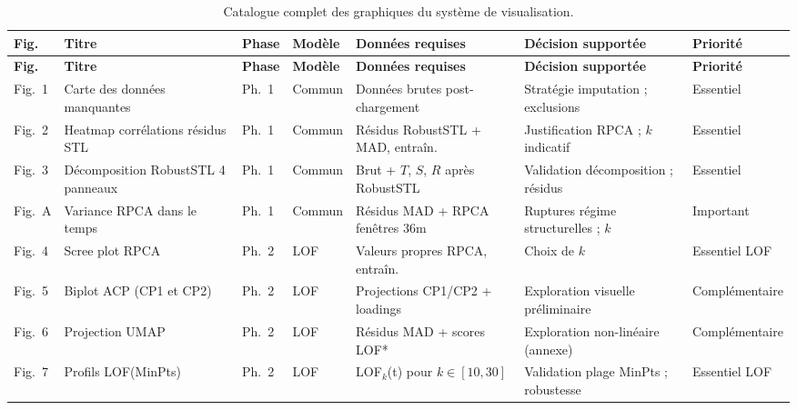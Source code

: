 \documentclass[12pt,a4paper]{article}
\begin{document}
\begin{landscape}
\begin{longtable}{p{1.5cm}p{3.8cm}p{2cm}p{1.5cm}p{3cm}p{3.5cm}p{2cm}}
\caption{Catalogue complet des graphiques du système de visualisation.}
\label{tab:catalogue}\\
\toprule
\textbf{Fig.} & \textbf{Titre} & \textbf{Phase} &
\textbf{Modèle} & \textbf{Données requises} &
\textbf{Décision supportée} & \textbf{Priorité} \\
\midrule
\endfirsthead
\toprule
\textbf{Fig.} & \textbf{Titre} & \textbf{Phase} &
\textbf{Modèle} & \textbf{Données requises} &
\textbf{Décision supportée} & \textbf{Priorité} \\
\midrule
\endhead
\bottomrule\endlastfoot

Fig.~1 & Carte des données manquantes &
Ph.~1 & Commun &
Données brutes post-chargement &
Stratégie imputation ; exclusions &
Essentiel \\
\midrule

Fig.~2 & Heatmap corrélations résidus STL &
Ph.~1 & Commun &
Résidus RobustSTL + MAD, entraîn. &
Justification RPCA ; $k$ indicatif &
Essentiel \\
\midrule

Fig.~3 & Décomposition RobustSTL 4 panneaux &
Ph.~1 & Commun &
Brut + $T$, $S$, $R$ après RobustSTL &
Validation décomposition ; résidus &
Essentiel \\
\midrule

Fig.~A & Variance RPCA dans le temps &
Ph.~1 & Commun &
Résidus MAD + RPCA fenêtres 36m &
Ruptures régime structurelles ; $k$ &
Important \\
\midrule

Fig.~4 & Scree plot RPCA &
Ph.~2 & LOF &
Valeurs propres RPCA, entraîn. &
Choix de $k$ &
Essentiel LOF \\
\midrule

Fig.~5 & Biplot ACP (CP1 et CP2) &
Ph.~2 & LOF &
Projections CP1/CP2 + loadings &
Exploration visuelle préliminaire &
Complémentaire \\
\midrule

Fig.~6 & Projection UMAP &
Ph.~2 & LOF &
Résidus MAD + scores LOF* &
Exploration non-linéaire (annexe) &
Complémentaire \\
\midrule

Fig.~7 & Profils LOF(MinPts) &
Ph.~2 & LOF &
LOF$_k$(t) pour $k \in [10,30]$ &
Validation plage MinPts ; robustesse &
Essentiel LOF \\
\midrule


\end{longtable}
\end{landscape}
\end{document}
